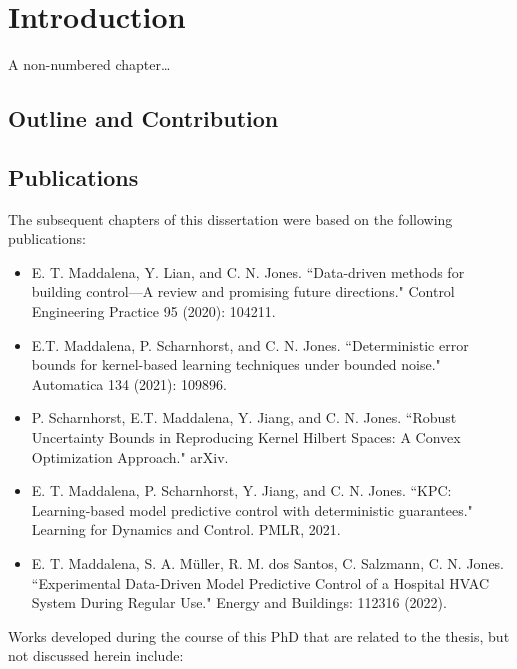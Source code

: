\cleardoublepage
\chapter{Introduction}
A non-numbered chapter\dots

\section{Outline and Contribution}

\section{Publications}

The subsequent chapters of this dissertation were based on the following publications:

\begin{itemize}
	\item E. T. Maddalena, Y. Lian, and C. N. Jones. ``Data-driven methods for building control—A review and promising future directions." Control Engineering Practice 95 (2020): 104211.
	
	\item E.T. Maddalena, P. Scharnhorst, and C. N. Jones. ``Deterministic error bounds for kernel-based learning techniques under bounded noise." Automatica 134 (2021): 109896.
	
	\item P. Scharnhorst, E.T. Maddalena, Y. Jiang, and C. N. Jones. ``Robust Uncertainty Bounds in Reproducing Kernel Hilbert Spaces: A Convex Optimization Approach." arXiv.
	
	\item E. T. Maddalena, P. Scharnhorst, Y. Jiang, and C. N. Jones. ``KPC: Learning-based model predictive control with deterministic guarantees." Learning for Dynamics and Control. PMLR, 2021.

	\item E. T. Maddalena, S. A. Müller, R. M. dos Santos, C. Salzmann, C. N. Jones. ``Experimental Data-Driven Model Predictive Control of a Hospital HVAC System During Regular Use." Energy and Buildings: 112316 (2022).
	
\end{itemize}

Works developed during the course of this PhD that are related to the thesis, but not discussed herein include:

